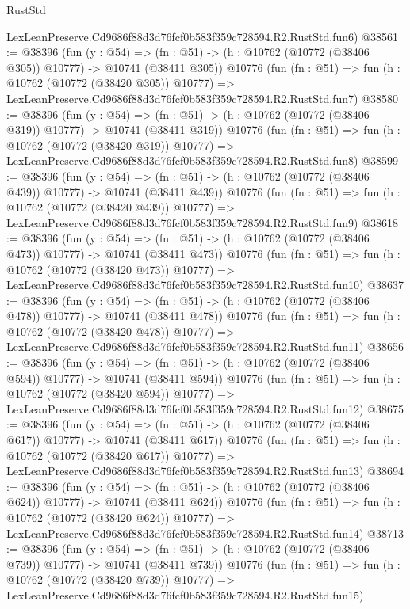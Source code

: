 \begin{lexlean}{RustStd}
\begin{coremodule}
    LexLeanPreserve.Cd9686f88d3d76fcf0b583f359c728594.R2.RustStd.fun6)
@38561 := @38396
    (fun (y : @54) =>
    (fn : @51) -> (h : @10762 (@10772 (@38406 @305)) @10777) -> @10741 (@38411 @305))
    @10776
    (fun (fn : @51) =>
    fun (h : @10762 (@10772 (@38420 @305)) @10777) =>
    LexLeanPreserve.Cd9686f88d3d76fcf0b583f359c728594.R2.RustStd.fun7)
@38580 := @38396
    (fun (y : @54) =>
    (fn : @51) -> (h : @10762 (@10772 (@38406 @319)) @10777) -> @10741 (@38411 @319))
    @10776
    (fun (fn : @51) =>
    fun (h : @10762 (@10772 (@38420 @319)) @10777) =>
    LexLeanPreserve.Cd9686f88d3d76fcf0b583f359c728594.R2.RustStd.fun8)
@38599 := @38396
    (fun (y : @54) =>
    (fn : @51) -> (h : @10762 (@10772 (@38406 @439)) @10777) -> @10741 (@38411 @439))
    @10776
    (fun (fn : @51) =>
    fun (h : @10762 (@10772 (@38420 @439)) @10777) =>
    LexLeanPreserve.Cd9686f88d3d76fcf0b583f359c728594.R2.RustStd.fun9)
@38618 := @38396
    (fun (y : @54) =>
    (fn : @51) -> (h : @10762 (@10772 (@38406 @473)) @10777) -> @10741 (@38411 @473))
    @10776
    (fun (fn : @51) =>
    fun (h : @10762 (@10772 (@38420 @473)) @10777) =>
    LexLeanPreserve.Cd9686f88d3d76fcf0b583f359c728594.R2.RustStd.fun10)
@38637 := @38396
    (fun (y : @54) =>
    (fn : @51) -> (h : @10762 (@10772 (@38406 @478)) @10777) -> @10741 (@38411 @478))
    @10776
    (fun (fn : @51) =>
    fun (h : @10762 (@10772 (@38420 @478)) @10777) =>
    LexLeanPreserve.Cd9686f88d3d76fcf0b583f359c728594.R2.RustStd.fun11)
@38656 := @38396
    (fun (y : @54) =>
    (fn : @51) -> (h : @10762 (@10772 (@38406 @594)) @10777) -> @10741 (@38411 @594))
    @10776
    (fun (fn : @51) =>
    fun (h : @10762 (@10772 (@38420 @594)) @10777) =>
    LexLeanPreserve.Cd9686f88d3d76fcf0b583f359c728594.R2.RustStd.fun12)
@38675 := @38396
    (fun (y : @54) =>
    (fn : @51) -> (h : @10762 (@10772 (@38406 @617)) @10777) -> @10741 (@38411 @617))
    @10776
    (fun (fn : @51) =>
    fun (h : @10762 (@10772 (@38420 @617)) @10777) =>
    LexLeanPreserve.Cd9686f88d3d76fcf0b583f359c728594.R2.RustStd.fun13)
@38694 := @38396
    (fun (y : @54) =>
    (fn : @51) -> (h : @10762 (@10772 (@38406 @624)) @10777) -> @10741 (@38411 @624))
    @10776
    (fun (fn : @51) =>
    fun (h : @10762 (@10772 (@38420 @624)) @10777) =>
    LexLeanPreserve.Cd9686f88d3d76fcf0b583f359c728594.R2.RustStd.fun14)
@38713 := @38396
    (fun (y : @54) =>
    (fn : @51) -> (h : @10762 (@10772 (@38406 @739)) @10777) -> @10741 (@38411 @739))
    @10776
    (fun (fn : @51) =>
    fun (h : @10762 (@10772 (@38420 @739)) @10777) =>
    LexLeanPreserve.Cd9686f88d3d76fcf0b583f359c728594.R2.RustStd.fun15)

\end{coremodule}
\end{lexlean}
